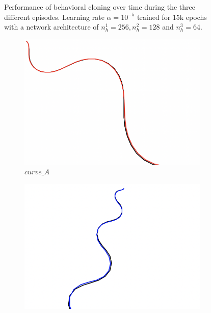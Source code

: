 \begin{figure}[H]
     \centering
         
        \caption{Performance of behavioral cloning over time during the three different episodes. Learning rate $\alpha = 10^{-5}$ trained for 15k epochs with a network architecture of $n_{h}^{1}=256, n_{h}^{2}=128$ and $n_{h}^{3}=64$.}
        \label{fig:bcCurves1}
\end{figure}


\begin{figure}[H]
     \centering
     \begin{subfigure}[b]{0.31\textwidth}
         \centering
         \includegraphics[width=\textwidth]{images/bc_curve_results/S3_A2_256_128_64_curve_A.png}
         \caption{$curve\_A$}
     \end{subfigure}
     \hfill
     \begin{subfigure}[b]{0.31\textwidth}
         \centering
         \includegraphics[width=\textwidth]{images/bc_curve_results/S3_A2_256_128_64_curve_B.png}

\end{subfigure}
\end{figure}
